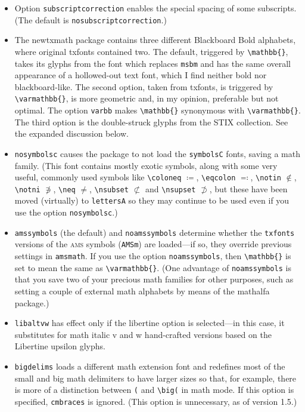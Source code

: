 \documentclass[11pt]{article}
\theoremstyle{oldplain}
\theoremstyle{plain}
\begin{document}
\begin{itemize}
\item Option {\tt subscriptcorrection} enables the special spacing of some subscripts. (The default is {\tt nosubscriptcorrection}.)
\item The \textsf{newtxmath} package contains three different Blackboard Bold alphabets, where original \textsf{txfonts} contained two. The default, triggered by \verb|\mathbb{}|, takes its glyphs from the font which replaces {\tt msbm} and has the same overall appearance of a hollowed-out text font, which I find neither bold nor blackboard-like. The second option, taken from \textsf{txfonts}, is triggered by \verb|\varmathbb{}|, is more geometric and, in my opinion, preferable but not optimal. The option {\tt varbb} makes \verb|\mathbb{}| synonymous with \verb|\varmathbb{}|. The third option is the double-struck glyphs from the STIX collection. See the expanded discussion below.
\item {\tt nosymbolsc} causes the package to not load the {\tt symbolsC} fonts, saving  a math family. (This font contains mostly exotic symbols, along with some very useful, commonly used symbols like \verb|\coloneq| $\coloneq$, \verb|\eqcolon| $\eqcolon$, \verb|\notin| $\notin$, \verb|\notni| $\notni$, \verb|\neq| $\neq$, \verb|\nsubset| $\nsubset$ and \verb|\nsupset| $\nsupset$, but these have been moved (virtually) to {\tt lettersA} so they may continue to be used even if you use the option {\tt nosymbolsc}.)
\item {\tt amssymbols} (the default) and {\tt noamssymbols} determine whether the {\tt txfonts} versions of the \textsc{ams} symbols ({\tt AMSm}) are loaded---if so, they override previous settings in {\tt amsmath}. If you use the option {\tt noamssymbols}, then \verb|\mathbb{}| is set to mean the same as \verb|\varmathbb{}|. (One advantage of {\tt noamssymbols} is that you save two of your precious math families for other purposes, such as setting a couple of external math alphabets by means of the \textsf{mathalfa} package.)
\item {\tt libaltvw} has effect only if the libertine option is selected---in this case, it substitutes for math italic v and w hand-crafted versions based on the Libertine upsilon glyphs.
\item{\tt bigdelims} loads a different math extension font and redefines most of the small and big math delimiters to have larger sizes so that, for example, there is more of a distinction between \verb|(| and \verb|\big(| in math mode. If this option is specified, {\tt cmbraces} is ignored. (This option is unnecessary, as of version 1.5.)

\end{itemize}
\end{document}
